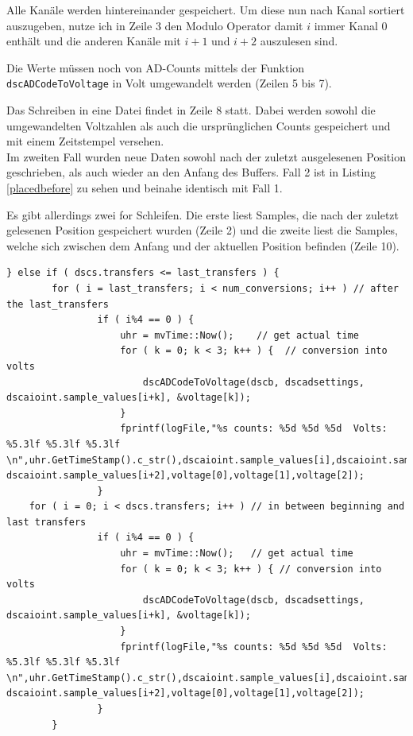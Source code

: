 \documentclass[12pt,a4paper,twoside,BCOR=12.5mm]{scrartcl}
\begin{document}
Alle Kanäle werden hintereinander gespeichert. Um diese nun nach Kanal sortiert auszugeben, nutze ich in Zeile 3 den Modulo Operator damit $i$ immer Kanal 0 enthält und die anderen Kanäle mit $i+1$ und $i+2$ auszulesen sind.

Die Werte müssen noch von AD-Counts mittels der Funktion \texttt{dscADCodeToVoltage} in Volt umgewandelt werden (Zeilen 5 bis 7).

Das Schreiben in eine Datei findet in Zeile 8 statt. Dabei werden sowohl die umgewandelten Voltzahlen als auch die ursprünglichen Counts gespeichert und mit einem Zeitstempel versehen. \\

Im zweiten Fall wurden neue Daten sowohl nach der zuletzt ausgelesenen Position geschrieben, als auch wieder an den Anfang des Buffers. Fall 2 ist in Listing \ref{placedbefore} zu sehen und beinahe identisch mit Fall 1. 

Es gibt allerdings zwei for Schleifen. Die erste liest Samples, die nach der zuletzt gelesenen Position gespeichert wurden (Zeile 2) und die zweite liest die Samples, welche sich zwischen dem Anfang und der aktuellen Position befinden (Zeile 10).
					
\begin{lstlisting}[frame=trBL]				
	} else if ( dscs.transfers <= last_transfers ) {
		for ( i = last_transfers; i < num_conversions; i++ ) // after the last_transfers
				if ( i%4 == 0 ) {
					uhr = mvTime::Now();    // get actual time
					for ( k = 0; k < 3; k++ ) {  // conversion into volts
						dscADCodeToVoltage(dscb, dscadsettings, dscaioint.sample_values[i+k], &voltage[k]);
					}
					fprintf(logFile,"%s counts: %5d %5d %5d  Volts: %5.3lf %5.3lf %5.3lf \n",uhr.GetTimeStamp().c_str(),dscaioint.sample_values[i],dscaioint.sample_values[i+1], dscaioint.sample_values[i+2],voltage[0],voltage[1],voltage[2]);
				}
	for ( i = 0; i < dscs.transfers; i++ ) // in between beginning and last transfers
				if ( i%4 == 0 ) {
					uhr = mvTime::Now();   // get actual time
					for ( k = 0; k < 3; k++ ) { // conversion into volts
						dscADCodeToVoltage(dscb, dscadsettings, dscaioint.sample_values[i+k], &voltage[k]);
					}
					fprintf(logFile,"%s counts: %5d %5d %5d  Volts: %5.3lf %5.3lf %5.3lf \n",uhr.GetTimeStamp().c_str(),dscaioint.sample_values[i],dscaioint.sample_values[i+1], dscaioint.sample_values[i+2],voltage[0],voltage[1],voltage[2]);
				}
        }
\end{lstlisting}
\end{document}
